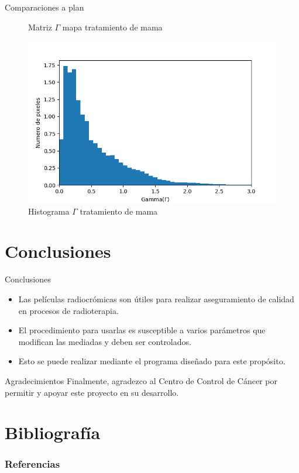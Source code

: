 \documentclass[12pt]{beamer}
\begin{document}
\begin{frame}{Comparaciones a plan}
\begin{figure}[htp]
\begin{minipage}{0.45\textwidth}
		\caption{Matriz $\Gamma$ mapa tratamiento de mama}
	\end{minipage}\hfill
	\begin{minipage}{0.45\textwidth}
		\includegraphics[width=\textwidth]{images/histogramaDosisMama.png}
		\caption{Histograma $\Gamma$ tratamiento de mama}
	\end{minipage}
\end{figure}
\end{frame}

\section{Conclusiones}

\begin{frame}{Conclusiones}
	\begin{itemize}
		\item Las películas radiocrómicas son útiles para realizar aseguramiento de calidad en procesos de radioterapia.
		\item El procedimiento para usarlas es susceptible a varios parámetros que modifican las mediadas y deben ser controlados.
		\item Esto se puede realizar mediante el programa diseñado para este propósito.
	\end{itemize}
\end{frame}

\begin{frame}{Agradecimientos}
Finalmente, agradezco al Centro de Control de Cáncer por permitir y apoyar este proyecto en su desarrollo.
\end{frame}




\section{Bibliografía}
\begin{frame}[allowframebreaks]
\frametitle{Referencias}
\nocite{*}


\end{frame}
\end{document}
